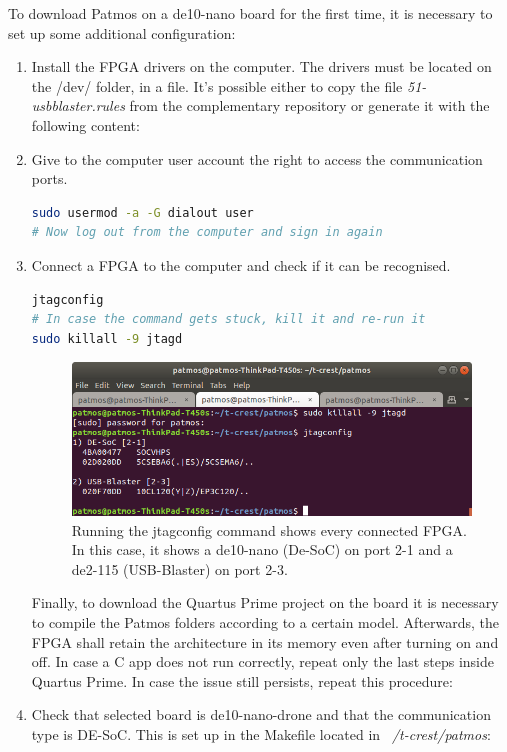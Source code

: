 To download Patmos on a de10-nano board for the first time, it is necessary to set up some additional configuration:
\begin{enumerate}
	\item Install the FPGA drivers on the computer. The drivers must be located on the /dev/ folder, in a file. It's possible either to copy the file \textit{51-usbblaster.rules} from the complementary repository\cite{bib:pred_repo} or generate it with the following content:
	
\lstset{style=OtherSt}
 	

	\item Give to the computer user account the right to access the communication ports.
	
\lstset{style=Bstyle}
\begin{lstlisting}[language=bash]
sudo usermod -a -G dialout user
# Now log out from the computer and sign in again
\end{lstlisting} 

	\item Connect a FPGA to the computer and check if it can be recognised.
	
\begin{lstlisting}[language=bash]
jtagconfig
# In case the command gets stuck, kill it and re-run it
sudo killall -9 jtagd
\end{lstlisting} 	


\begin{figure}[H]
    \centering
        \includegraphics[scale=0.5]{Figures/setup/jtagconfig.png}
    \caption{Running the jtagconfig command shows every connected FPGA. In this case, it shows a de10-nano (De-SoC) on port 2-1 and a de2-115 (USB-Blaster) on port 2-3.}
    \label{fig:jtagconfig}
\end{figure}

Finally, to download the Quartus Prime project on the board it is necessary to compile the Patmos folders according to a certain model. Afterwards, the FPGA shall retain the architecture in its memory even after turning on and off. 
In case a C app does not run correctly, repeat only the last steps inside Quartus Prime. In case the issue still persists, repeat this procedure:
    \item Check that selected board is de10-nano-drone and that the communication type is DE-SoC. This is set up in the Makefile located in \textit{~/t-crest/patmos}:


\end{enumerate}
